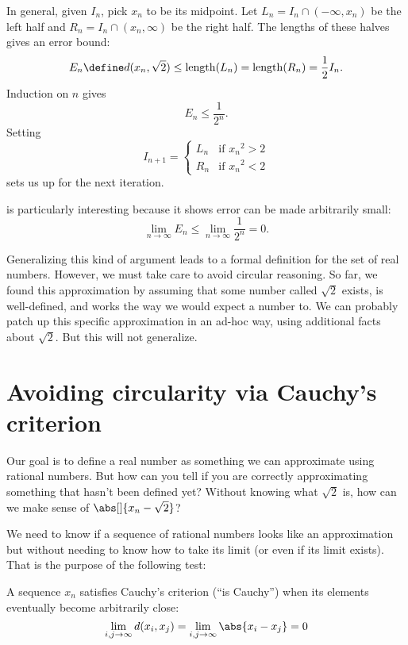 \documentclass{scrartcl}
\newcommand{\dist}{d}
\newcommand{\length}{\mathrm{length}}
\begin{document}
\begin{example}
  In general, given \(I_{n}\), pick \(x_{n}\) to be its midpoint. Let \(L_{n}=I_{n} \cap (-\infty, x_{n})\) be the left half and \(R_{n}=I_{n}\cap (x_{n},\infty)\) be the right half. The lengths of these halves gives an error bound:
  \[
    E_{n} \define \dist(x_{n},\sqrt 2) \leq \length(L_{n}) = \length(R_{n}) = \frac12 I_{n}.
  \]
  Induction on $n$ gives
  \begin{equation}
    E_{n} \leq \frac{1}{2^{n}}.\label{eq:binary search error bound}
  \end{equation}
  Setting
  \[
    I_{n+1} =
    \begin{cases}
      L_{n}& \textrm{if } {x_{n}}^{2} > 2\\
      R_{n}& \textrm{if } {x_{n}}^{2} < 2
    \end{cases}
  \]
  sets us up for the next iteration.

   is particularly interesting because it shows error can be made arbitrarily small:
  \[
    \lim_{n\to\infty} E_{n} \leq \lim_{n\to\infty}\frac{1}{2^{n}} =0.
  \]
\end{example}

Generalizing this kind of argument leads to a formal definition for the set of real numbers. However, we must take care to avoid circular reasoning. So far, we found this approximation by assuming that some number called \(\sqrt 2\) exists, is well-defined, and works the way we would expect a number to. We can probably patch up this specific approximation in an ad-hoc way, using additional facts about \(\sqrt 2\). But this will not generalize.

\section{Avoiding circularity via Cauchy's criterion}
Our goal is to define a real number as something we can approximate using rational numbers. But how can you tell if you are correctly approximating something that hasn't been defined yet?
Without knowing what \(\sqrt 2\) is, how can we make sense of \(\abs[]{x_{n}-\sqrt 2}\)?

We need to know if a sequence of rational numbers looks like an approximation but without needing to know how to take its limit (or even if its limit exists). That is the purpose of the following test:
\begin{defn}\label{Cauchy's criterion}
  A sequence \(x_{n}\) satisfies Cauchy's criterion (``is Cauchy'') when its elements eventually become arbitrarily close:
  \[
    \lim_{i,j\to\infty} d(x_{i},x_{j})=\lim_{i,j\to \infty} \abs{x_{i}-x_{j}} =0
  \]
\end{defn}
\end{document}
